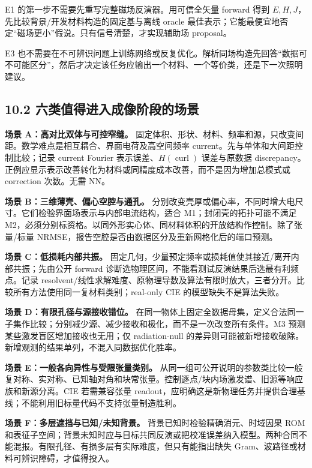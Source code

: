 \documentclass[11pt,a4paper]{article}
\begin{document}
E1 的第一步不需要先重写完整磁场反演器。用可信全矢量 forward 得到
\(E,H,J\)，先比较背景/开发材料构造的固定基与离线 oracle
最佳表示；它能最便宜地否定``磁场更小''假说。只有信号清楚，才实现辅助场
proposal。

E3
也不需要在不可辨识问题上训练网络或反复优化。解析同场构造先回答``数据可不可能区分''，然后才决定该任务应输出一个材料、一个等价类，还是下一次照明建议。

\hypertarget{ux516dux7c7bux503cux5f97ux8fdbux5165ux6210ux50cfux9636ux6bb5ux7684ux573aux666f}{%
\subsection{10.2
六类值得进入成像阶段的场景}\label{ux516dux7c7bux503cux5f97ux8fdbux5165ux6210ux50cfux9636ux6bb5ux7684ux573aux666f}}

\textbf{场景 A：高对比双体与可控窄缝。}
固定体积、形状、材料、频率和源，只改变间距。数学难点是相互耦合、界面电荷及高空间频率
current。先与单体和大间距控制比较；记录 current Fourier
表示误差、\(H(\operatorname{curl})\) 误差与原数据
discrepancy。正例应显示表示改善转化为材料或同精度成本改善，而不是因为增加总模式或
correction 次数。无需 NN。

\textbf{场景 B：三维薄壳、偏心空腔与通孔。}
分别改变壳厚或偏心率，不同时增大电尺寸。它们检验界面场表示与内部电流结构，适合
M1；封闭壳的拓扑可能不满足
M2，必须分别标资格。以同外形实心体、同材料体积的开放结构作控制。除了张量/标量
NRMSE，报告空腔是否由数据区分及重新网格化后的端口预测。

\textbf{场景 C：低损耗内部共振。}
固定几何，少量预定频率或损耗值使其接近/离开内部共振；先由公开 forward
诊断选物理区间，不能看测试反演结果后选最有利频点。记录
resolvent/线性求解难度、原物理导数及算法有限时放大，三者分开。比较所有方法使用同一复材料类别；real-only
CIE 的模型缺失不是算法失败。

\textbf{场景 D：有限孔径与源接收错位。}
在同一物体上固定全数据母集，定义合法同一子集作比较；分别减少源、减少接收和极化，而不是一次改变所有条件。M3
预测某些激发盲区增加接收也无用；仅 radiation-null
的差异则可能被新增接收破除。新增观测的结果单列，不混入同数据优化胜率。

\textbf{场景 E：一般各向异性与受限张量类别。}
从同一组可公开说明的参数类比较一般复对称、实对称、已知轴对角和块常张量。控制逐点/块内场激发谱、旧源等响应族和新源分离。CIE
若需兼容张量
readout，应明确这是新物理任务并提供合理基线；不能利用旧标量代码不支持张量制造胜利。

\textbf{场景 F：多层遮挡与已知/未知背景。}
背景已知时检验精确消元、时域因果 ROM
和表征子空间；背景未知时应与目标共同反演或把校准误差纳入模型。两种合同不能混报。有限孔径、有损多层有实际难度，但只有能指出缺失
Gram、波路径或材料可辨识障碍，才值得投入。
\end{document}
